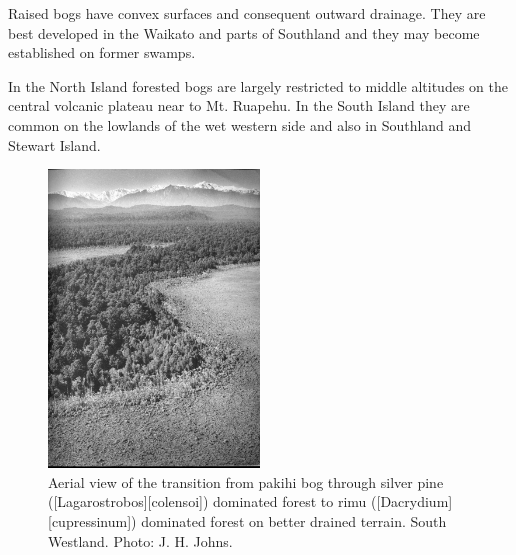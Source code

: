 Raised bogs have convex surfaces and consequent outward drainage.
They are best developed in the Waikato and parts of Southland and they may become established on former swamps.

In the North Island forested bogs are largely restricted to middle altitudes on the central volcanic plateau near to Mt. Ruapehu.
In the South Island they are common on the lowlands of the wet western side and also in Southland and Stewart Island.

\begin{figure}
	\includegraphics[width=0.5\textwidth]{graphics/figure68transition.jpg}
	\centering
	\caption[Aerial view of the transition from pakihi bog through silver pine to rimu]{Aerial view of the transition from pakihi bog through silver pine ([Lagarostrobos][colensoi]) dominated forest to rimu ([Dacrydium][cupressinum]) dominated forest on better drained terrain.
South Westland.
	Photo: J. H. Johns.}%
	\label{fig:68transition}
\end{figure}

